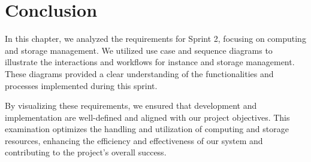 \vspace*{15cm}

\section*{Conclusion}
In this chapter, we analyzed the requirements for Sprint 2, focusing on computing and storage management. We utilized use case and sequence diagrams to illustrate the interactions and workflows for instance and storage management. These diagrams provided a clear understanding of the functionalities and processes implemented during this sprint.

By visualizing these requirements, we ensured that development and implementation are well-defined and aligned with our project objectives. This examination optimizes the handling and utilization of computing and storage resources, enhancing the efficiency and effectiveness of our system and contributing to the project's overall success.